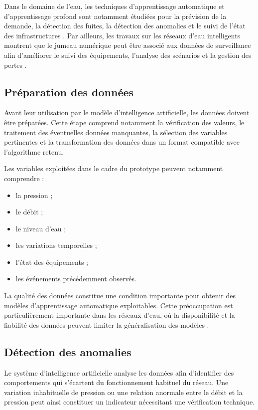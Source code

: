 Dans le domaine de l'eau, les techniques d'apprentissage automatique
et d'apprentissage profond sont notamment étudiées pour la prévision de
la demande, la détection des fuites, la détection des anomalies et le
suivi de l'état des infrastructures \cite{ref133}. Par ailleurs, les
travaux sur les réseaux d'eau intelligents montrent que le jumeau
numérique peut être associé aux données de surveillance afin d'améliorer
le suivi des équipements, l'analyse des scénarios et la gestion des
pertes \cite{ref134}.

\subsection{Préparation des données}

Avant leur utilisation par le modèle d'intelligence artificielle, les
données doivent être préparées. Cette étape comprend notamment la
vérification des valeurs, le traitement des éventuelles données
manquantes, la sélection des variables pertinentes et la transformation
des données dans un format compatible avec l'algorithme retenu.

Les variables exploitées dans le cadre du prototype peuvent notamment
comprendre :

\begin{itemize}
	\item la pression ;
	\item le débit ;
	\item le niveau d'eau ;
	\item les variations temporelles ;
	\item l'état des équipements ;
	\item les événements précédemment observés.
\end{itemize}

La qualité des données constitue une condition importante pour obtenir
des modèles d'apprentissage automatique exploitables. Cette
préoccupation est particulièrement importante dans les réseaux d'eau,
où la disponibilité et la fiabilité des données peuvent limiter la
généralisation des modèles \cite{ref133}.

\subsection{Détection des anomalies}

Le système d'intelligence artificielle analyse les données afin
d'identifier des comportements qui s'écartent du fonctionnement
habituel du réseau. Une variation inhabituelle de pression ou une
relation anormale entre le débit et la pression peut ainsi constituer
un indicateur nécessitant une vérification technique.

